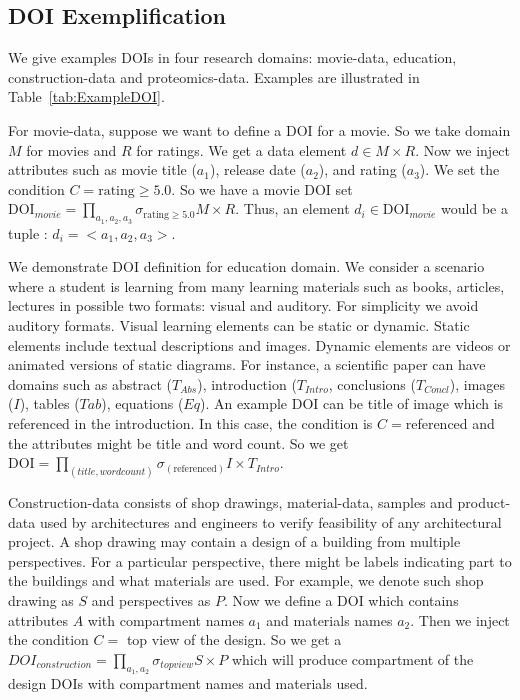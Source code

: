 \subsection{DOI Exemplification}
We give examples DOIs in four research domains: movie-data, education, construction-data and proteomics-data. Examples are illustrated in Table~\ref{tab:ExampleDOI}. 

For movie-data, suppose we want to define a DOI for a movie. So we take domain $M$ for movies and $R$ for ratings. We get a data element $d \in M \times R$. Now we inject attributes such as movie title ($a_1$), release date ($a_2$), and rating ($a_3$). We set the condition $C= \text{rating} \geq 5.0$. So we have a movie DOI set $\text{DOI}_{movie} = \prod_{a_1,a_2,a_3}\sigma_{\text{rating} \geq 5.0} M \times R$. Thus, an element $d_i \in \text{DOI}_{movie}$ would be a tuple : $d_i =< a_1, a_2, a_3>$. 


We demonstrate DOI definition for education domain. We consider a scenario where a student is learning from many learning materials such as books, articles, lectures in possible two formats: visual and auditory. For simplicity we avoid auditory formats. Visual learning elements can be static or dynamic. Static elements include textual descriptions and images. Dynamic elements are videos or animated versions of static diagrams. For instance, a scientific paper can have domains such as abstract ($T_{Abs}$), introduction ($T_{Intro}$, conclusions ($T_{Concl}$), images ($I$), tables ($Tab$), equations ($Eq$). An example DOI can be title of image which is referenced in the introduction. In this case, the condition is $C=$referenced and the attributes might be title and word count. So we get $\text{DOI} = \prod_{(title, wordcount)} \sigma_{(\text{referenced})} I \times T_{Intro}$. 


Construction-data consists of shop drawings, material-data, samples and product-data used by architectures and engineers to verify feasibility of any architectural project. A shop drawing may contain a design of a building from multiple perspectives. For a particular perspective, there might be labels indicating part to the buildings and what materials are used. For example, we denote such shop drawing as $S$ and perspectives as $P$. Now we define a DOI which contains attributes $A$ with compartment names $a_1$ and materials names $a_2$. Then we inject the condition $C=$ top view of the design. So we get a $DOI_{construction} = \prod_{a_1,a_2} \sigma_{topview} S \times P$ which will produce compartment of the design DOIs with compartment names and materials used. 


